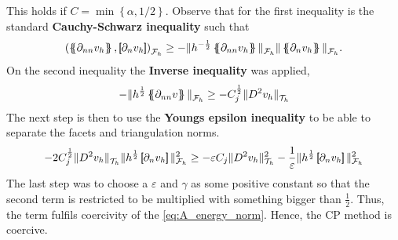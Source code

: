 This holds if $C=\min\left\{  \alpha , 1 /2\right\}$.
Observe that for the first inequality is the standard \textbf{Cauchy-Schwarz inequality} such that $$\left( \mean{ \partial_{nn} v_{h} }  , \jump{ \partial _{n} v_{h} }   \right) _{\mathcal{F} _{h}} \ge - \| h^{-\frac{1}{2}} \mean{ \partial _{nn}
v_{h} }    \|_{\mathcal{F}_{h}   }^{  } \| \mean{ \partial _{n}v_{h} }   \|_{ \mathcal{F}_{h}   }^{  } .  $$ On the second inequality the \textbf{Inverse inequality} was applied,
\[
- \| h^{\frac{1}{2}} \left\{\!\!\left\{ \partial _{nn}v \right\}\!\!\right\}   \|_{ \mathcal{F} _{h}  }^{  }\ge - C_{j}^{\frac{1}{2}} \| D ^2 v_{h} \|_{ \mathcal{T} _{h} }^{  }
\]
The next step is then to use the \textbf{Youngs epsilon inequality} to be able to separate the facets and triangulation norms. \[
 - 2 C^{\frac{1}{2}}_{j} \|  D ^2 v_{h}    \|_{ \mathcal{T} _{h}  }^{  } \| h^{\frac{1}{2}} \jump{ \partial _{n} v_{h} }   \|_{ \mathcal{F} _{h} }^{2  } \ge- \varepsilon C_{j} \| D ^2 v_{h} \|_{ \mathcal{T} _{h} }^{2  } -
 \frac{1}{\varepsilon } \| h^{\frac{1}{2}} \jump{ \partial _{n} v_{h} }   \|_{ \mathcal{F} _{h} }^{2  }
\]
The last step was to choose a $\varepsilon $ and $\gamma $ as some positive constant so that the second term is restricted to be multiplied with something bigger than $\frac{1}{2}$. Thus, the term fulfils coercivity of the \eqref{eq:A_energy_norm}. Hence, the CP method is coercive.

